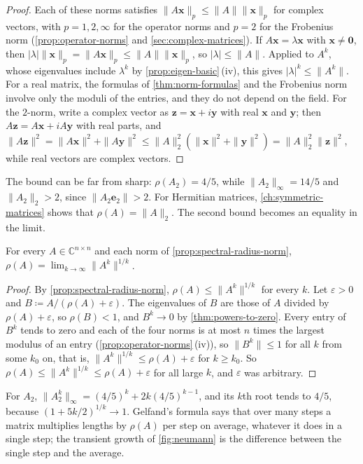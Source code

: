 \begin{proof}
Each of these norms satisfies $\|A\mathbf x\|_p\le\|A\|\|\mathbf x\|_p$ for complex vectors, with $p=1,2,\infty$ for the operator norms and $p=2$ for the Frobenius norm (\cref{prop:operator-norms} and \cref{sec:complex-matrices}). If $A\mathbf x=\lambda\mathbf x$ with $\mathbf x\ne\mathbf 0$, then $|\lambda|\|\mathbf x\|_p=\|A\mathbf x\|_p\le\|A\|\|\mathbf x\|_p$, so $|\lambda|\le\|A\|$. Applied to $A^k$, whose eigenvalues include $\lambda^k$ by \cref{prop:eigen-basic}\,(iv), this gives $|\lambda|^k\le\|A^k\|$. For a real matrix, the formulas of \cref{thm:norm-formulas} and the Frobenius norm involve only the moduli of the entries, and they do not depend on the field. For the $2$-norm, write a complex vector as $\mathbf z=\mathbf x+i\mathbf y$ with real $\mathbf x$ and $\mathbf y$; then $A\mathbf z=A\mathbf x+iA\mathbf y$ with real parts, and $\|A\mathbf z\|^2=\|A\mathbf x\|^2+\|A\mathbf y\|^2\le\|A\|_2^2(\|\mathbf x\|^2+\|\mathbf y\|^2)=\|A\|_2^2\|\mathbf z\|^2$, while real vectors are complex vectors.
\end{proof}

The bound can be far from sharp: $\rho(A_2)=4/5$, while $\|A_2\|_\infty=14/5$ and $\|A_2\|_2>2$, since $\|A_2\mathbf e_2\|>2$. For Hermitian matrices, \cref{ch:symmetric-matrices} shows that $\rho(A)=\|A\|_2$. The second bound becomes an equality in the limit.

\begin{theorem}
\label{thm:gelfand}
For every $A\in\mathbb C^{n\times n}$ and each norm of \cref{prop:spectral-radius-norm}, $\rho(A)=\lim_{k\to\infty}\|A^k\|^{1/k}$.
\end{theorem}

\begin{proof}
By \cref{prop:spectral-radius-norm}, $\rho(A)\le\|A^k\|^{1/k}$ for every $k$. Let $\varepsilon>0$ and $B\coloneqq A/(\rho(A)+\varepsilon)$. The eigenvalues of $B$ are those of $A$ divided by $\rho(A)+\varepsilon$, so $\rho(B)<1$, and $B^k\to0$ by \cref{thm:powers-to-zero}. Every entry of $B^k$ tends to zero and each of the four norms is at most $n$ times the largest modulus of an entry (\cref{prop:operator-norms}\,(iv)), so $\|B^k\|\le1$ for all $k$ from some $k_0$ on, that is, $\|A^k\|^{1/k}\le\rho(A)+\varepsilon$ for $k\ge k_0$. So $\rho(A)\le\|A^k\|^{1/k}\le\rho(A)+\varepsilon$ for all large $k$, and $\varepsilon$ was arbitrary.
\end{proof}

For $A_2$, $\|A_2^k\|_\infty=(4/5)^k+2k(4/5)^{k-1}$, and its $k$th root tends to $4/5$, because $(1+5k/2)^{1/k}\to1$. Gelfand's formula says that over many steps a matrix multiplies lengths by $\rho(A)$ per step on average, whatever it does in a single step; the transient growth of \cref{fig:neumann} is the difference between the single step and the average.

